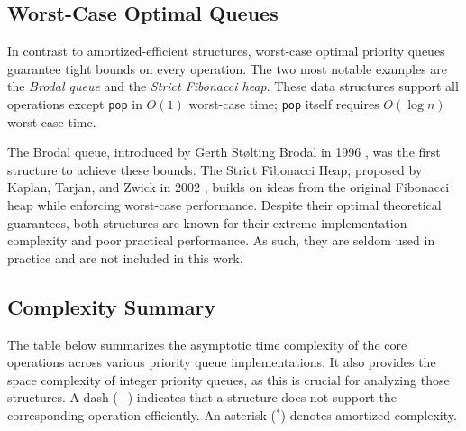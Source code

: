 \subsection{Worst-Case Optimal Queues}

In contrast to amortized-efficient structures, worst-case optimal priority queues guarantee tight bounds on every operation. The two most notable examples are the \emph{Brodal queue} and the \emph{Strict Fibonacci heap}. These data structures support all operations except \texttt{pop} in \(O(1)\) worst-case time; \texttt{pop} itself requires \(O(\log n)\) worst-case time.

The Brodal queue, introduced by Gerth Stølting Brodal in 1996 \cite{brodal1996worst}, was the first structure to achieve these bounds. The Strict Fibonacci Heap, proposed by Kaplan, Tarjan, and Zwick in 2002 \cite{kaplan2002fibonacci}, builds on ideas from the original Fibonacci heap while enforcing worst-case performance. Despite their optimal theoretical guarantees, both structures are known for their extreme implementation complexity and poor practical performance. As such, they are seldom used in practice and are not included in this work.

\subsection{Complexity Summary}

The table below summarizes the asymptotic time complexity of the core operations across various priority queue implementations. It also provides the space complexity of integer priority queues, as this is crucial for analyzing those structures. A dash (\(-\)) indicates that a structure does not support the corresponding operation efficiently. An asterisk (\(^*\)) denotes amortized complexity.

